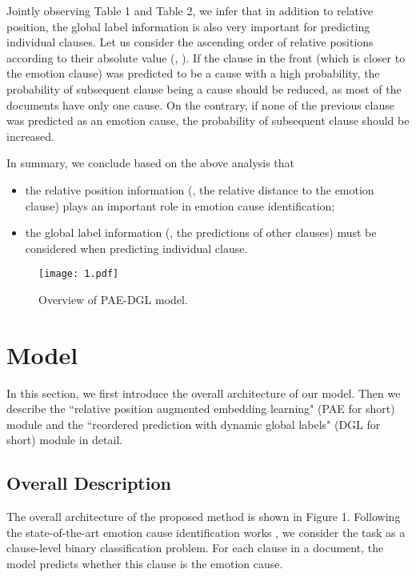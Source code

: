 \documentclass[letterpaper]{article} \usepackage{aaai19}  \usepackage{times}  \usepackage{helvet}  \usepackage{courier}  \usepackage{url}  \usepackage{graphicx}  \frenchspacing  \setlength{\pdfpagewidth}{8.5in}  \setlength{\pdfpageheight}{11in}  \setcounter{secnumdepth}{0}
\begin{document}
Jointly observing Table 1 and Table 2, we infer that in addition to relative position, the global label information is also very important for predicting individual clauses. Let us consider the ascending order of relative positions according to their absolute value (, ). If the clause in the front (which is closer to the emotion clause) was predicted to be a cause with a high probability, the probability of subsequent clause being a cause should be reduced, as most of the documents have only one cause. On the contrary, if none of the previous clause was predicted as an emotion cause, the probability of subsequent clause should be increased.

In summary, we conclude based on the above analysis that
\begin{itemize}
	\item the relative position information (, the relative distance to the emotion clause) plays an important role in emotion cause identification;
	\item the global label information (, the predictions of other clauses) must be considered when predicting individual clause.
\end{itemize}



\begin{figure*}[!t]
	\centering
	\texttt{[image: 1.pdf]}
	\caption{\label{font-table}Overview of PAE-DGL model.}
	\label{fig_sim1}
\end{figure*}





\section{Model}
In this section, we first introduce the overall architecture of our model. Then we describe the ``relative position augmented embedding learning" (PAE for short) module and the ``reordered prediction with dynamic global labels" (DGL for short) module in detail.

\subsection{Overall Description}

The overall architecture of the proposed method is shown in Figure 1. Following the state-of-the-art emotion cause identification works \cite{gui2017question}, we consider the task as a clause-level binary classification problem. For each clause in a document, the model predicts whether this clause is the emotion cause.
\end{document}
